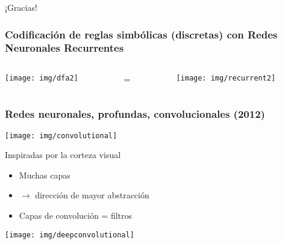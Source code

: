 \begin{myframe}
\centering
{\Huge ¡Gracias!}
\end{myframe}


\begin{myframe}
\frametitle{Codificación de reglas simbólicas (discretas) con Redes Neuronales Recurrentes}
\centering
\begin{columns}
    \begin{column}{0.47\textwidth}
    \centering
    \texttt{[image: img/dfa2]}
    \end{column}
    
    \begin{column}{0.02\textwidth}
    \centering
    =
    \end{column}
    
    \begin{column}{0.47\textwidth}
    \centering
    \texttt{[image: img/recurrent2]}
    \end{column}
\end{columns}
\end{myframe}




\begin{myframe}
\frametitle{Redes neuronales, profundas, convolucionales (2012)}
\centering


\texttt{[image: img/convolutional]}

\begin{block}{\centering Inspiradas por la corteza visual}
\centering
\begin{itemize}
\centering
\item Muchas capas
\item $\rightarrow$ dirección de mayor abstracción
\item Capas de convolución = filtros
\end{itemize}
\end{block}

\texttt{[image: img/deepconvolutional]}
\end{myframe}
